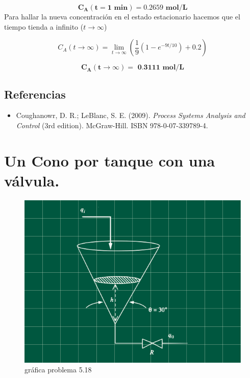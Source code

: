 \documentclass[
  letterpaper,
  DIV=11,
  numbers=noendperiod]{scrreprt}
\providecommand{\tightlist}{%
  \setlength{\itemsep}{0pt}\setlength{\parskip}{0pt}}\usepackage{longtable,booktabs,array}
\begin{document}
\[
\mathbf{C_A(t=1\textbf{ min})=0.2659\textbf{ mol/L}}
\] Para hallar la nueva concentración en el estado estacionario hacemos
que el tiempo tienda a infinito (\(t\to\infty\))

\[
C_A(t\to\infty)=\lim_{t\to\infty}\left(\frac{1}{9}(1-e^{-9t/10})+0.2\right)
\]

\[
\mathbf{C_A(t\to\infty)=\textbf{ 0.3111 mol/L}}
\]

\hypertarget{referencias-8}{%
\section{Referencias}\label{referencias-8}}

\begin{itemize}
\tightlist
\item
  Coughanowr, D. R.; LeBlanc, S. E. (2009). \emph{Process Systems
  Analysis and Control} (3rd edition). McGraw-Hill. ISBN
  978-0-07-339789-4.
\end{itemize}

\hypertarget{un-cono-por-tanque-con-una-vuxe1lvula.}{%
\chapter{Un Cono por tanque con una
válvula.}\label{un-cono-por-tanque-con-una-vuxe1lvula.}}

\begin{figure}

{\centering \includegraphics{././images/p5.18-coughanowr/headercontrol518.png}

}

\caption{gráfica problema 5.18}

\end{figure}
\end{document}
